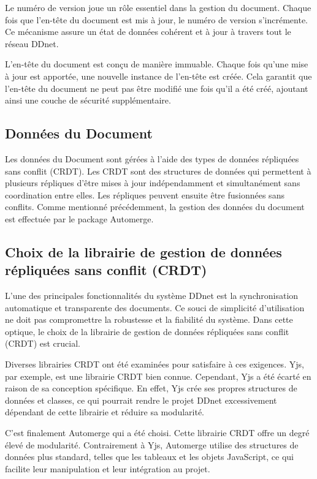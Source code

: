 Le numéro de version joue un rôle essentiel dans la gestion du document. Chaque fois que l'en-tête du document est mis à jour, le numéro de version s'incrémente. Ce mécanisme assure un état de données cohérent et à jour à travers tout le réseau DDnet.

L'en-tête du document est conçu de manière immuable. Chaque fois qu'une mise à jour est apportée, une nouvelle instance de l'en-tête est créée. Cela garantit que l'en-tête du document ne peut pas être modifié une fois qu'il a été créé, ajoutant ainsi une couche de sécurité supplémentaire.

\subsection{Données du Document}

Les données du Document sont gérées à l'aide des types de données répliquées sans conflit (CRDT). Les CRDT sont des structures de données qui permettent à plusieurs répliques d'être mises à jour indépendamment et simultanément sans coordination entre elles. Les répliques peuvent ensuite être fusionnées sans conflits.
Comme mentionné précédemment, la gestion des données du document est effectuée par le package Automerge.

\subsection{Choix de la librairie de gestion de données répliquées sans conflit (CRDT)}

L'une des principales fonctionnalités du système DDnet est la synchronisation automatique et transparente des documents. Ce souci de simplicité d'utilisation ne doit pas compromettre la robustesse et la fiabilité du système. Dans cette optique, le choix de la librairie de gestion de données répliquées sans conflit (CRDT) est crucial.

Diverses librairies CRDT ont été examinées pour satisfaire à ces exigences. Yjs, par exemple, est une librairie CRDT bien connue. Cependant, Yjs a été écarté en raison de sa conception spécifique. En effet, Yjs crée ses propres structures de données et classes, ce qui pourrait rendre le projet DDnet excessivement dépendant de cette librairie et réduire sa modularité.

C'est finalement Automerge qui a été choisi. Cette librairie CRDT offre un degré élevé de modularité. Contrairement à Yjs, Automerge utilise des structures de données plus standard, telles que les tableaux et les objets JavaScript, ce qui facilite leur manipulation et leur intégration au projet.

